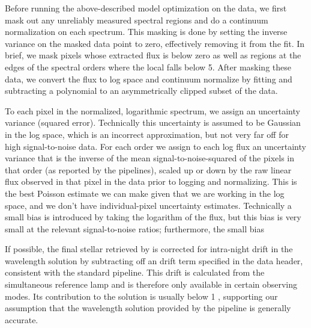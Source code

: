 \documentclass[twocolumn]{aastex62}
\begin{document}
Before running the above-described model optimization on the data, we first mask out any unreliably measured spectral regions and do a continuum normalization on each spectrum. 
This masking is done by setting the inverse variance on the masked data point to zero, effectively removing it from the fit. 
In brief, we mask pixels whose extracted flux is below zero as well as regions at the edges of the spectral orders where the local \SNR falls below 5. 
After masking these data, we convert the flux to log space and continuum normalize by fitting and subtracting a polynomial to an asymmetrically clipped subset of the data. 

To each pixel in the normalized, logarithmic spectrum, we assign an uncertainty variance (squared error).
Technically this uncertainty is assumed to be Gaussian in the log space, which is an incorrect approximation, but not very far off for high signal-to-noise data. 
For each order we assign to each log flux an uncertainty variance that is the inverse of the mean signal-to-noise-squared of the pixels in that order (as reported by the \HARPS pipelines), scaled up or down by the raw linear flux observed in that pixel in the data prior to logging and normalizing. 
This is the best Poisson estimate we can make given that we are working in the log space, and we don't have individual-pixel uncertainty estimates. 
Technically a small bias is introduced by taking the logarithm of the flux, but this bias is very small at the relevant signal-to-noise ratios; furthermore, the small bias %

If possible, the final stellar \RV retrieved by \wobble is corrected for intra-night drift in the wavelength solution by subtracting off an \RV drift term specified in the data header, consistent with the standard \HARPS pipeline. 
This drift is calculated from the simultaneous reference lamp and is therefore only available in certain observing modes. 
Its contribution to the \RV solution is usually below 1 \ms, supporting our assumption that the wavelength solution provided by the \HARPS pipeline is generally accurate.
\end{document}
